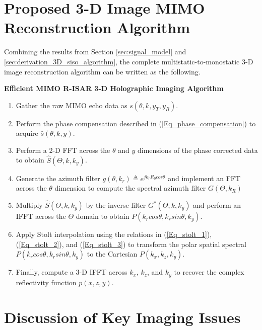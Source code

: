 \documentclass[conference]{IEEEtran}
\begin{document}
		
		\section{Proposed 3-D Image MIMO Reconstruction Algorithm}
		\label{sec:3D_mimo_algorithm}
		
		Combining the results from Section \ref{sec:signal_model} and \ref{sec:derivation_3D_siso_algorithm}, the complete multistatic-to-monostatic 3-D image reconstruction algorithm can be written as the following.		
		
		\textbf{Efficient MIMO R-ISAR 3-D Holographic Imaging Algorithm}
		\begin{enumerate}
			\item Gather the raw MIMO echo data as $s(\theta,k,y_T,y_R)$.
			\item Perform the phase compensation described in (\ref{Eq_phase_compensation}) to acquire $\hat{s}(\theta,k,y)$.
			\item Perform a 2-D FFT across the $\theta$ and $y$ dimensions of the phase corrected data to obtain $\hat{S}(\Theta,k,k_y)$.
			\item Generate the azimuth filter $g(\theta,k_r) \triangleq e^{jk_rR_0cos\theta}$ and implement an FFT across the $\theta$ dimension to compute the spectral azimuth filter $G(\Theta,k_R)$
			\item Multiply $\hat{S}(\Theta,k,k_y)$ by the inverse filter $G^*(\Theta,k,k_y)$  and perform an IFFT across the $\Theta$ domain to obtain $P(k_rcos\theta,k_rsin\theta,k_y)$.
			\item Apply Stolt interpolation using the relations in (\ref{Eq_stolt_1}), (\ref{Eq_stolt_2}), and (\ref{Eq_stolt_3}) to transform the polar spatial spectral $P(k_rcos\theta,k_rsin\theta,k_y)$ to the Cartesian $P(k_x,k_z,k_y)$.
			\item Finally, compute a 3-D IFFT across $k_x$, $k_z$, and $k_y$ to recover the complex reflectivity function $p(x,z,y)$.
		\end{enumerate}
		
		\section{Discussion of Key Imaging Issues}
		\label{sec:key_issues}
		
\end{document}
